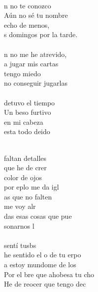 \begin{cancion}%
	   \\
	n no te conozco\\
Aún no sé tu nombre\\
	 echo de menos, \\
	s domingos por la tarde.\\
\jump\\
	n no me he atrevido, \\
a jugar mis cartas\\
	 tengo miedo \\
	 no conseguir jugarlas\\
\jump\\
	detuvo el tiempo\\
Un beso furtivo\\
	 en mi cabeza\\
	 esta todo deido  \\\jump\\
	\begin{chorus}%
	faltan detalles \\
	que he de crer\\
	color de ojos \\
	por eplo me da igl\\
	as que no falten \\
	me voy alr\\
	das esas cosas que pue \\
	sonarnos l\\
\jump\\
	sentí tusbs\\
	he sentido el o de tu erpo\\
	a estoy mundome de los \\
	Por el bre que ahobesa tu cho\\
	He de reocer que tengo dec\\

\end{chorus}
\end{cancion}
